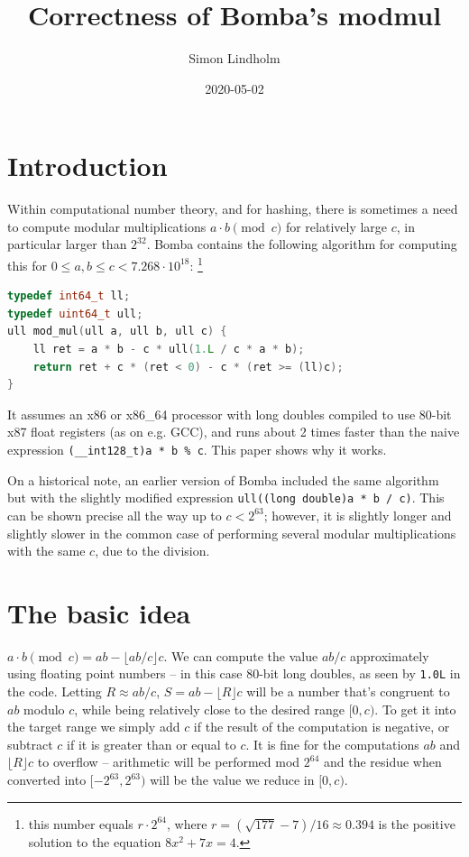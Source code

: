 \documentclass{article}
\title{Correctness of Bomba's modmul}
\author{Simon Lindholm}
\date{2020-05-02}
\begin{document}
\maketitle

\section{Introduction}

Within computational number theory, and for hashing, there is sometimes a need to compute modular multiplications $a \cdot b \pmod{c}$ for relatively large $c$, in particular larger than $2^{32}$. Bomba contains the following algorithm for computing this for $0 \le a, b \le c < 7.268\cdot 10^{18}$: \footnote{this number equals $r \cdot 2^{64}$, where $r = (\sqrt{177} - 7) / 16 \approx 0.394$ is the positive solution to the equation $8x^2 + 7x = 4$.}

\begin{lstlisting}[language=C++]
typedef int64_t ll;
typedef uint64_t ull;
ull mod_mul(ull a, ull b, ull c) {
    ll ret = a * b - c * ull(1.L / c * a * b);
    return ret + c * (ret < 0) - c * (ret >= (ll)c);
}
\end{lstlisting}

\noindent
It assumes an x86 or x86\_64 processor with long doubles compiled to use 80-bit x87 float registers (as on e.g. GCC),
and runs about 2 times faster than the naive expression \lstinline{(__int128_t)a * b % c}.
This paper shows why it works.

On a historical note, an earlier version of Bomba included the same algorithm but with the slightly modified expression \texttt{ull((long double)a * b / c)}. This can be shown precise all the way up to $c < 2^{63}$; however, it is slightly longer and slightly slower in the common case of performing several modular multiplications with the same $c$, due to the division.

\section{The basic idea}

$a \cdot b \pmod{c} = ab - \lfloor ab/c \rfloor c$. We can compute the value $ab/c$ approximately using floating point numbers -- in this case 80-bit long doubles, as seen by \texttt{1.0L} in the code. Letting $R \approx ab/c$, $S = ab - \lfloor R \rfloor c$ will be a number that's congruent to $ab$ modulo $c$, while being relatively close to the desired range $[0, c)$. To get it into the target range we simply add $c$ if the result of the computation is negative, or subtract $c$ if it is greater than or equal to $c$. It is fine for the computations $ab$ and $\lfloor R \rfloor c$ to overflow -- arithmetic will be performed mod $2^{64}$ and the residue when converted into $[-2^{63}, 2^{63})$ will be the value we reduce in $[0, c)$.
\end{document}
